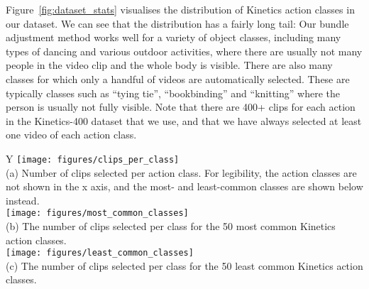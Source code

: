 \documentclass[10pt,twocolumn,letterpaper]{article}
\begin{document}
Figure~\ref{fig:dataset_stats} visualises the distribution of Kinetics action classes in our dataset.
We can see that the distribution has a fairly long tail:
Our bundle adjustment method works well for a variety of object classes, including many types of dancing and various outdoor activities, where there are usually not many people in the video clip and the whole body is visible.
There are also many classes for which only a handful of videos are automatically selected. These are typically classes such as ``tying tie'', ``bookbinding'' and ``knitting'' where the person is usually not fully visible.
Note that there are 400+ clips for each action in the Kinetics-400 dataset \cite{kay_arxiv_2017} that we use, and that we have always selected at least one video of each action class.

\begin{figure*}
	\centering
	\vspace{-2\baselineskip}
	\begin{tabularx}{\linewidth}{Y}
	 	\texttt{[image: figures/clips\_per\_class]} \\ 
	 	(a) Number of clips selected per action class. For legibility, the action classes are not shown in the x axis, and the most- and least-common classes are shown below instead. \\
\texttt{[image: figures/most\_common\_classes]} \\ 
	 	(b) The number of clips selected per class for the 50 most common Kinetics action classes. \\
\texttt{[image: figures/least\_common\_classes]} \\ 
	 	(c) The number of clips selected per class for the 50 least common Kinetics action classes. \\
	\end{tabularx}
	\vspace{\baselineskip}
	\caption{Number of video clips selected per action class in the Kinetics dataset. (a) shows the overall distribution of video clips selected per action class, whilst (b) and (c) show the most- and least-common Kinetics action classes respectively.}
	\label{fig:dataset_stats}

\end{figure*} 
\end{document}

